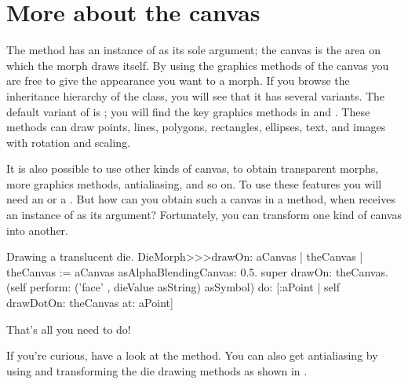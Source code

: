 \documentclass[a4paper,10pt,twoside]{book}
\begin{document}


\section{More about the canvas}

The  method has an instance of  as its sole argument;
the canvas is the area on which the morph draws itself.
By using the graphics methods of the canvas you are free to give the appearance you want to a morph.
If you browse the inheritance hierarchy of the  class, you will see that it has several variants.
The default variant of  is ; you will find the key graphics methods in  and .
These methods can draw points, lines, polygons, rectangles, ellipses, text, and images with rotation and scaling.

It is also possible to use other kinds of canvas, to obtain transparent morphs, more graphics methods, antialiasing, and so on.
To use these features you will need an  or a .
But how can you obtain such a canvas in a  method, when  receives an instance of  as its argument?
Fortunately, you can transform one kind of canvas into another.

\begin{method}{Drawing a translucent die.}
DieMorph>>>drawOn: aCanvas
	| theCanvas |
	theCanvas := aCanvas asAlphaBlendingCanvas: 0.5.
	super drawOn: theCanvas.
	(self perform: ('face' , dieValue asString) asSymbol)
		do: [:aPoint | self drawDotOn: theCanvas at: aPoint]
\end{method}
\noindent
That's all you need to do!

If you're curious, have a look at the  method.
You can also get antialiasing by using  and transforming the die drawing methods as shown in .
\end{document}
